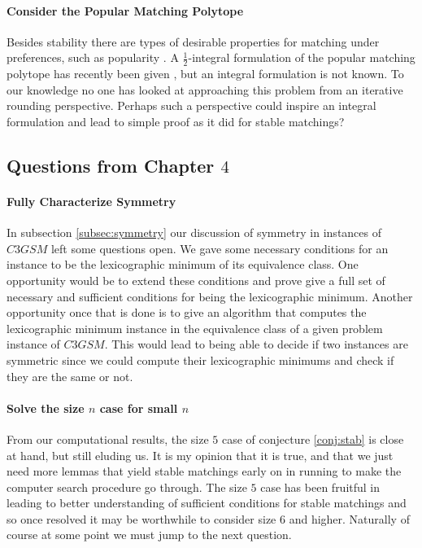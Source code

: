 \paragraph{Consider the Popular Matching Polytope}
Besides stability there are types of desirable properties for matching under preferences, such as popularity \cite{abraham2007popular}. A $\frac{1}{2}$-integral formulation of the popular matching polytope has recently been given \cite{kavitha2016popular}, but an integral formulation is not known. To our knowledge no one has looked at approaching this problem from an iterative rounding perspective. Perhaps such a perspective could inspire an integral formulation and lead to simple proof as it did for stable matchings?

\subsection{Questions from Chapter $4$}

\paragraph{Fully Characterize Symmetry}
In subsection \ref{subsec:symmetry} our discussion of symmetry in instances of $C3GSM$ left some questions open. We gave some necessary conditions for an instance to be the lexicographic minimum of its equivalence class. One opportunity would be to extend these conditions and prove give a full set of necessary and sufficient conditions for being the lexicographic minimum. Another opportunity once that is done is to give an algorithm that computes the lexicographic minimum instance in the equivalence class of a given problem instance of $C3GSM$. This would lead to being able to decide if two instances are symmetric since we could compute their lexicographic minimums and check if they are the same or not.

\paragraph{Solve the size $n$ case for small $n$}
From our computational results, the size $5$ case of conjecture \ref{conj:stab} is close at hand, but still eluding us. It is my opinion that it is true, and that we just need more lemmas that yield stable matchings early on in running to make the computer search procedure go through. The size $5$ case has been fruitful in leading to better understanding of sufficient conditions for stable matchings and so once resolved it may be worthwhile to consider size $6$ and higher. Naturally of course at some point we must jump to the next question.

